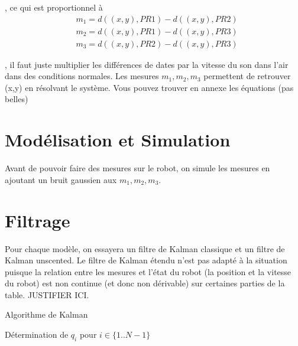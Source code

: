 \documentclass[a4paper, 8pt]{article}
\begin{document}
, ce qui est proportionnel à
\begin{equation}\label{2}
		\begin{split}
		& m_{1} = d((x,y),PR1)-d((x,y),PR2)\\
		& m_{2} = d((x,y),PR1)-d((x,y),PR3)\\
		& m_{3} = d((x,y),PR2)-d((x,y),PR3)
		\end{split}
\end{equation}

, il faut juste multiplier les différences de dates par la vitesse du son dans l'air dans des conditions normales. Les mesures $m_{1}, m_{2},  m_{3}$ permettent de retrouver (x,y) en résolvant le système. Vous pouvez trouver en annexe les équations (pas belles) 


\section{Modélisation et Simulation}

Avant de pouvoir faire des mesures sur le robot, on simule les mesures en ajoutant un bruit gaussien aux $ m_{1}, m_{2},  m_{3}$.

\section{Filtrage}

Pour chaque modèle, on essayera un filtre de Kalman classique et un filtre  de Kalman unscented. Le filtre de Kalman étendu n'est pas adapté à la situation puisque la relation entre les mesures et l'état du robot (la position et la vitesse du robot) est non continue (et donc non dérivable) sur certaines parties de la table. JUSTIFIER ICI.

Algorithme de Kalman
\begin{algorithm}[H]
		
	\caption{Détermination de $q_i$ pour $i \in \{1..N-1\}$}
	\end{algorithm}
	
\end{document}
